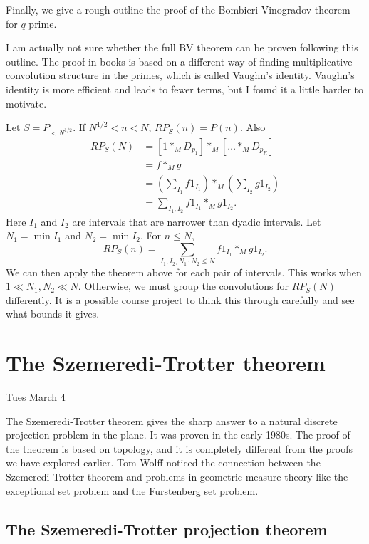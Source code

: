 \documentclass[12pt]{amsart}
\begin{document}
Finally,  we give a rough outline the proof of the Bombieri-Vinogradov theorem for $q$ prime. 

I am actually not sure whether the full BV theorem can be proven following this outline.   The proof in books is based on a different way of finding multiplicative convolution structure in the primes,  which is called Vaughn's identity.   Vaughn's identity is more efficient and leads to fewer terms, but I found it a little harder to motivate.
    
    Let $S = P_{< N^{1/2}}$. If $N^{1/2} < n < N$, $RP_S(n) = P(n)$. Also
    \begin{align*}
        RP_S(N) & = [ 1 *_M D_{p_1} ] *_M [\ldots *_M D_{p_R}] \\
        & = f *_M g \\
        & = \left( \sum_{I_1} f 1_{I_1} \right) *_M \left( \sum_{I_2} g 1_{I_2} \right) \\
        & = \sum_{I_1, I_2} f 1_{I_1} *_M g 1_{I_2}.
    \end{align*}
    Here $I_1$ and $I_2$ are intervals that are narrower than dyadic intervals. Let $N_1 = \min I_1$ and $N_2 = \min I_2$. For $n \leq N$,
    \[
        RP_S(n) = \sum_{I_1, I_2, N_1 \cdot N_2 \leq N} f 1_{I_1} *_M g 1_{I_2}.
    \]
    We can then apply the theorem above for each pair of intervals. This works when $1 \ll N_1, N_2 \ll N$. Otherwise, we must group the convolutions for $RP_S(N)$ differently.  It is a possible course project to think this through carefully and see what bounds it gives.

\newpage

\section{The Szemeredi-Trotter theorem}

Tues March 4

The Szemeredi-Trotter theorem gives the sharp answer to a natural discrete projection problem in the plane.   It was proven in the early 1980s.  The proof of the theorem is based on topology,  and it is completely different from the proofs we have explored earlier.  Tom Wolff noticed the connection between the Szemeredi-Trotter theorem and problems in geometric measure theory like the exceptional set problem and the Furstenberg set problem.

\subsection{The Szemeredi-Trotter projection theorem} 
\end{document}

